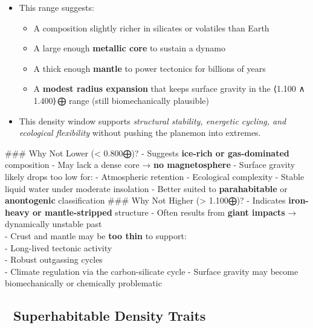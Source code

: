 \documentclass[
  letterpaper,
]{book}
\providecommand{\tightlist}{%
  \setlength{\itemsep}{0pt}\setlength{\parskip}{0pt}}
\begin{document}
\begin{itemize}
\tightlist
\item
  This range suggests:

  \begin{itemize}
  \tightlist
  \item
    A composition slightly richer in silicates or volatiles than Earth\\
  \item
    A large enough \textbf{metallic core} to sustain a dynamo\\
  \item
    A thick enough \textbf{mantle} to power tectonics for billions of
    years\\
  \item
    A \textbf{modest radius expansion} that keeps surface gravity in the
    ⟨1.100 ∧ 1.400⟩\,⨁ range (still biomechanically plausible)
  \end{itemize}
\item
  This density window supports \emph{structural stability, energetic
  cycling, and ecological flexibility} without pushing the planemon into
  extremes.
\end{itemize}

\#\#\# Why Not Lower (\textless{} 0.800⨁)? - Suggests \textbf{ice-rich
or gas-dominated} composition - May lack a dense core → \textbf{no
magnetosphere} - Surface gravity likely drops too low for: - Atmospheric
retention - Ecological complexity - Stable liquid water under moderate
insolation - Better suited to \textbf{parahabitable} or
\textbf{anontogenic} classification \#\#\# Why Not Higher
(\textgreater{} 1.100⨁)? - Indicates \textbf{iron-heavy or
mantle-stripped} structure - Often results from \textbf{giant impacts} →
dynamically unstable past\\
- Crust and mantle may be \textbf{too thin} to support:\\
- Long-lived tectonic activity\\
- Robust outgassing cycles\\
- Climate regulation via the carbon-silicate cycle - Surface gravity may
become biomechanically or chemically problematic

\subsection{🧠 Superhabitable Density
Traits}\label{superhabitable-density-traits}
\end{document}
